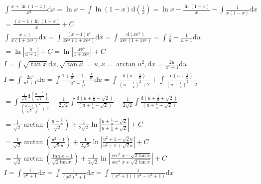 \documentclass{article}
\begin{document}
\begin{align*} 
    \int \frac{x+\ln(1-x)}{x^2} \mathrm{d}x = \ln x - \int \ln(1-x) \mathrm{d} \left(\frac{1}{x}\right) = \ln x - \frac{\ln(1-x)}{x} - \int \frac{1}{x(1-x)} \mathrm{d}x \\ 
    = \frac{(x-1)\ln (1-x)}{x} + C\\
    \int \frac{x+1}{x(1+x\mathrm{e}^x)} \mathrm{d}x = \int \frac{(x+1)\mathrm{e}^x}{x\mathrm{e}^x(1+x\mathrm{e}^x)}\mathrm{d}x = \int \frac{\mathrm{d}(x\mathrm{e}^x)}{x\mathrm{e}^x(1+x\mathrm{e}^x)} = \int \frac{1}{u}-\frac{1}{u+1} \mathrm{d}u \\ 
    = \ln\left|\frac{u}{u+1}\right| + C = \ln \left|\frac{x\mathrm{e}^x}{1+x\mathrm{e}^x}\right| + C \\
    I = \int \sqrt{\tan x}\mathrm{d}x , \sqrt{\tan x} = u , x = \arctan u^2 , \mathrm{d}x = \frac{2u}{u^4 + 1}\mathrm{d}u \\
    I = \int \frac{2u^2}{u^4 + 1}\mathrm{d}u = \int \frac{1 + \frac{1}{u^2} + 1 - \frac{1}{u^2}}{u^2+\frac{1}{u^2}} \mathrm{d}u = \int \frac{\mathrm{d}(u-\frac{1}{u})}{\left(u-\frac{1}{u}\right)^2+2} + \int \frac{\mathrm{d}(u+\frac{1}{u})}{(u + \frac{1}{u})^2 - 2} \\
    = \int \frac{\frac{1}{\sqrt{2}}\mathrm{d}(\frac{u-\frac{1}{u}}{\sqrt{2}})}{\left(\frac{u-\frac{1}{u}}{\sqrt{2}}\right)^2 + 1} + \frac{1}{2\sqrt{2}}\int \frac{\mathrm{d}(u+\frac{1}{u}-\sqrt{2})}{\left(u+\frac{1}{u}-\sqrt{2}\right)} - \frac{1}{2\sqrt{2}} \int \frac{\mathrm{d}(u+\frac{1}{u} + \sqrt{2})}{\left(u+\frac{1}{u} + \sqrt{2}\right)} \\
    = \frac{1}{\sqrt{2}}\arctan \left(\frac{u-\frac{1}{u}}{\sqrt{2}}\right) + \frac{1}{2\sqrt{2}}\ln \left|\frac{u + \frac{1}{u} -\sqrt{2}}{u + \frac{1}{u} + \sqrt{2}}\right| + C \\
    = \frac{1}{\sqrt{2}}\arctan \left(\frac{u^2 - 1}{\sqrt{2}u}\right) + \frac{1}{2\sqrt{2}}\ln \left|\frac{u^2 + 1 -\sqrt{2}u}{u^2 + 1 + \sqrt{2}u}\right| + C \\
    = \frac{1}{\sqrt{2}}\arctan \left(\frac{\tan x - 1}{\sqrt{2\tan x}}\right) + \frac{1}{2\sqrt{2}}\ln \left|\frac{\sec^2 x - \sqrt{2\tan x}}{\sec^2 x + \sqrt{2\tan x}} \right| + C \\
    I = \int \frac{1}{x^6+1} \mathrm{d}x = \int \frac{1}{(x^2)^3+1}\mathrm{d}x = \int \frac{1}{(x^2+1)(x^4 - x^2+1)} \mathrm{d}x \\
\end{align*}
\end{document}

